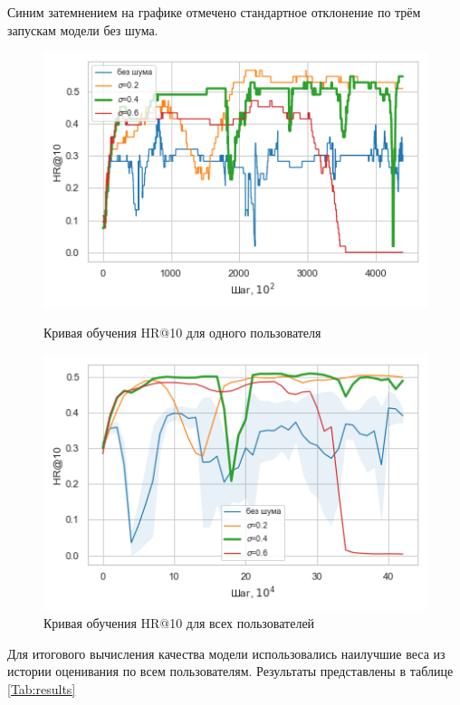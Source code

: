 \documentclass[14pt]{extarticle}
\begin{document}
Синим затемнением на графике отмечено стандартное отклонение по трём запускам модели без шума.

\begin{figure}[H]
	\begin{minipage}[b]{0.49\textwidth}
		\centering
		\includegraphics[scale=0.55]{img/curve_hit.png}
	\caption{Кривая обучения HR@10 для одного пользователя}  
	\label{fig:hit_curve}
	\end{minipage}
	\hfill
	\begin{minipage}[b]{0.49\textwidth}
		\centering
		\includegraphics[scale=0.55]{img/curve_hit_all_.png}
	\caption{Кривая обучения HR@10 для всех пользователей}
	\label{fig:hit_curve}
	\end{minipage}
\end{figure}


Для итогового вычисления качества модели использовались наилучшие веса из истории оценивания по всем пользователям. Результаты представлены в таблице \ref{Tab:results}
\end{document}
